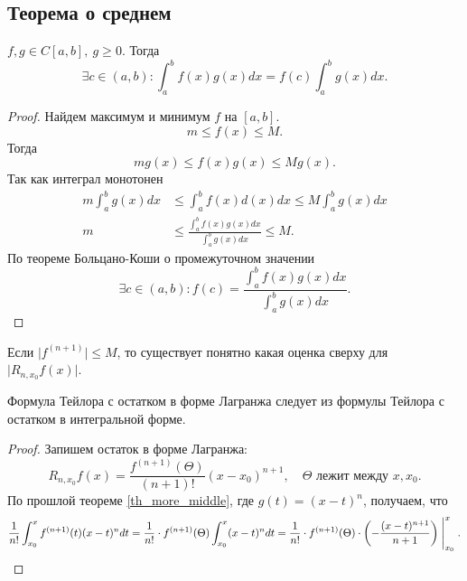 \subsection{Теорема о среднем}
\begin{thm}\label{th_more_middle}
    $ f, g \in  C[a, b], ~ g \ge 0$. Тогда 
    \[
	\exists c \in (a, b): \int_{a}^{b} f(x) g(x) dx = f(c) \int_{a}^{b} g(x) dx  
    .\] 
\end{thm}
\begin{proof}
    Найдем максимум и минимум $ f$ на $ [a, b]$. \[
	m \le f(x) \le M
    .\] 
    Тогда \[
	m g(x) \le f(x) g(x) \le M g(x)
    .\] 
    Так как интеграл монотонен
    \begin{align*}
	m \int_{a}^{b} g(x) dx & \le  \int_{a}^{b} f(x) d(x) dx \le M \int_{a}^{b} g(x) dx   
	\\
	m &\le  \frac{\int_{a}^{b} f(x)g(x)dx}{\int_{a}^{b} g(x)dx } \le M 
	.
    \end{align*}
    По теореме Больцано-Коши о промежуточном значении 
    \[
	\exists c \in (a, b): f(c) = \frac{\int_{a}^{b} f(x)g(x)dx}{\int_{a}^{b} g(x)dx } 
    .\] 
\end{proof}
\begin{cor}
    Если $ \lvert f^{(n+1)} \rvert \le M$, то существует понятно какая оценка сверху для $ \lvert R_{n, x_0} f(x) \rvert$.
\end{cor}
\begin{thm}
    Формула Тейлора с остатком в форме Лагранжа следует из формулы Тейлора с остатком в интегральной форме.
\end{thm}
\begin{proof}
    Запишем остаток в форме Лагранжа:
    \[
	R_{n, x_0} f(x) = \frac{f^{(n+1)}(\Theta)}{(n+1)!} (x-x_0)^{n+1}, \quad \Theta \text{ лежит между } x, x_0
    .\] 
    По прошлой теореме \ref{th_more_middle}, где $ g(t) = (x-t)^{n}$, получаем, что
    \[
	\frac{1}{n!} \int_{x_0}^{x} f^{(n+1)} (t)(x-t)^{n} dt = \frac{1}{n!} \cdot f^{(n+1)}(\Theta) \int_{x_0}^{x} (x-t)^{n}dt = \frac{1}{n!} \cdot f^{(n+1)}(\Theta) \cdot \left(-\frac{  (x-t)^{n+1}}{n+1} \right) \Biggm |_{x_0}^{x}
    .\] 
\end{proof}

